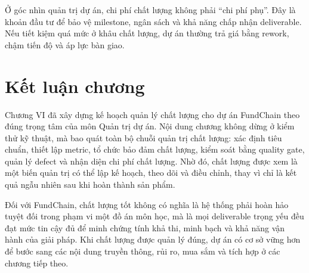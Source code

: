 Ở góc nhìn quản trị dự án, chi phí chất lượng không phải ``chi phí phụ''. Đây là khoản đầu tư để bảo vệ milestone, ngân sách và khả năng chấp nhận deliverable. Nếu tiết kiệm quá mức ở khâu chất lượng, dự án thường trả giá bằng rework, chậm tiến độ và áp lực bàn giao.

\fi
\section{Kết luận chương}

Chương VI đã xây dựng kế hoạch quản lý chất lượng cho dự án FundChain theo đúng trọng tâm của môn Quản trị dự án. Nội dung chương không dừng ở kiểm thử kỹ thuật, mà bao quát toàn bộ chuỗi quản trị chất lượng: xác định tiêu chuẩn, thiết lập metric, tổ chức bảo đảm chất lượng, kiểm soát bằng quality gate, quản lý defect và nhận diện chi phí chất lượng. Nhờ đó, chất lượng được xem là một biến quản trị có thể lập kế hoạch, theo dõi và điều chỉnh, thay vì chỉ là kết quả ngẫu nhiên sau khi hoàn thành sản phẩm.

Đối với FundChain, chất lượng tốt không có nghĩa là hệ thống phải hoàn hảo tuyệt đối trong phạm vi một đồ án môn học, mà là mọi deliverable trọng yếu đều đạt mức tin cậy đủ để minh chứng tính khả thi, minh bạch và khả năng vận hành của giải pháp. Khi chất lượng được quản lý đúng, dự án có cơ sở vững hơn để bước sang các nội dung truyền thông, rủi ro, mua sắm và tích hợp ở các chương tiếp theo.
